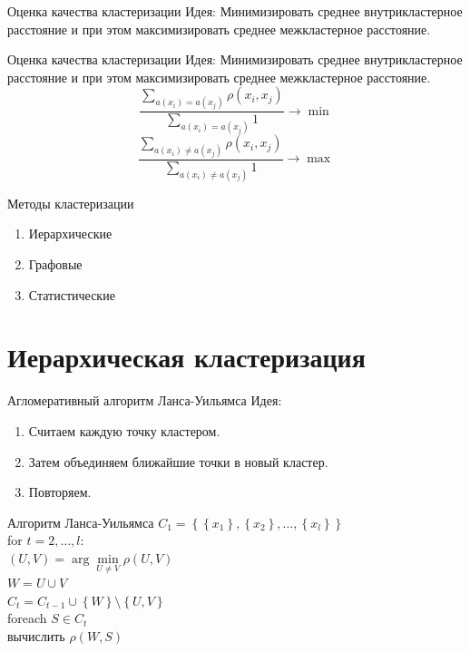 \documentclass[10pt]{beamer}
\begin{document}
\begin{frame}{Оценка качества кластеризации}
  \alert{Идея}: Минимизировать среднее внутрикластерное расстояние и при этом максимизировать среднее межкластерное расстояние.
\end{frame}

\begin{frame}{Оценка качества кластеризации}
  \alert{Идея}: Минимизировать среднее внутрикластерное расстояние и при этом максимизировать среднее межкластерное расстояние.
	\bigbreak
	$${\frac{\sum\limits_{a(x_i) = a(x_j)} \rho(x_i, x_j)}{\sum\limits_{a(x_i) = a(x_j)} 1} \rightarrow \min}$$
	\bigbreak
	$${\frac{\sum\limits_{a(x_i) \neq a(x_j)} \rho(x_i, x_j)}{\sum\limits_{a(x_i) \neq a(x_j)} 1} \rightarrow \max}$$
\end{frame}


\begin{frame}{Методы кластеризации}
	\begin{enumerate} [-]
		\item Иерархические
		\item Графовые 
		\item Статистические 
	\end{enumerate}
\end{frame}

\section{Иерархическая кластеризация}

\begin{frame}{Агломеративный алгоритм Ланса-Уильямса}
	\alert{Идея}:\\
	\begin{enumerate}
		\item Считаем каждую точку кластером. 
		\item Затем объединяем ближайшие точки в новый кластер. 
		\item Повторяем.
	\end{enumerate}
\end{frame}


\begin{frame}{Алгоритм Ланса-Уильямса}
	${C_1 = \left\{ \left\{ x_1\right\}, \left\{x_2 \right\}, \dots, \left\{x_l \right\} \right\}}$\\
	for ${t=2, \dots, l }$:\\
	\hspace{5mm} ${(U, V) = \arg\min\limits_{U \neq V} \rho(U, V)}$\\
	\hspace{5mm} $W = U \cup V$\\
	\hspace{5mm} ${C_t = C_{t-1} \cup \left\{ W \right\}\setminus \left\{U, V \right\} }$\\
	\hspace{5mm} foreach ${S \in C_t}$\\
	\hspace{10mm}   вычислить $\rho(W, S)$\\
\end{frame}
\end{document}
